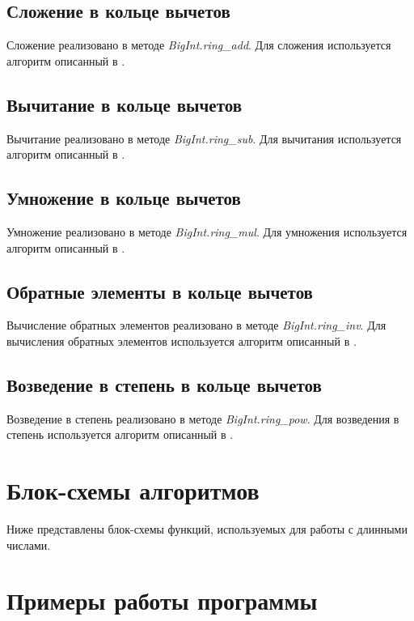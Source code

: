 \subsection{Сложение в кольце вычетов}
Сложение реализовано в методе \textit{BigInt.ring\_add}. Для сложения используется алгоритм описанный в \cite{zavg}.

\subsection{Вычитание в кольце вычетов}
Вычитание реализовано в методе \textit{BigInt.ring\_sub}. Для вычитания используется алгоритм описанный в \cite{zavg}.

\subsection{Умножение в кольце вычетов}
Умножение реализовано в методе \textit{BigInt.ring\_mul}. Для умножения используется алгоритм описанный в \cite{zavg}.

\subsection{Обратные элементы в кольце вычетов}
Вычисление обратных элементов реализовано в методе \textit{BigInt.ring\_inv}. Для вычисления обратных элементов используется алгоритм описанный в \cite{zavg}.

\subsection{Возведение в степень в кольце вычетов}
Возведение в степень реализовано в методе \textit{BigInt.ring\_pow}. Для возведения в степень используется алгоритм описанный в \cite{zavg}.

\section{Блок-схемы алгоритмов}
Ниже представлены блок-схемы функций, используемых для работы с длинными числами.












\clearpage

\section{Примеры работы программы}

